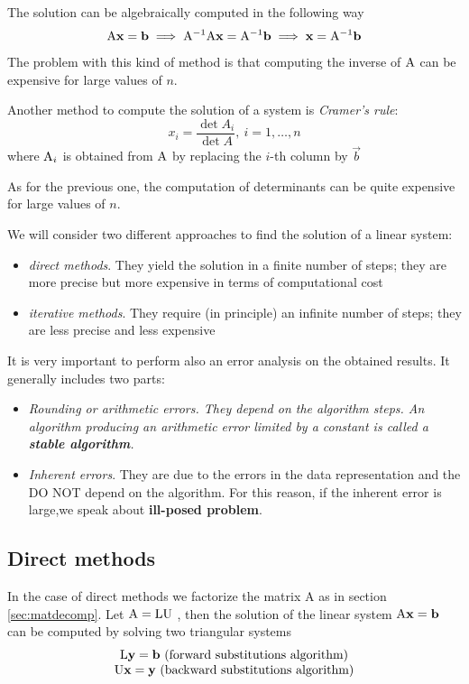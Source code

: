 The solution can be algebraically computed in the following way
$$ \mathrm{A}\mathbf{x} = \mathbf{b} \implies \mathrm{A}^{-1}\mathrm{A}\mathbf{x} = \mathrm{A}^{-1}\mathbf{b} \implies \mathbf{x} = \mathrm{A}^{-1}\mathbf{b} $$
The problem with this kind of method is that computing the inverse of $\mathrm{A}$ can be expensive for large values of $n$.

Another method to compute the solution of a system is \textit{Cramer's rule}:
$$ x_i = \frac{\det{A_i}}{\det{A}},\ i = 1, \hdots, n $$
where $\mathrm{A}_i$ is obtained from $\mathrm{A}$ by replacing the $i$-th column by $\vec{b}$

As for the previous one, the computation of determinants can be quite expensive for large values of $n$.

We will consider two different approaches to find the solution of a linear system:

\begin{itemize}
    \item \textit{direct methods}. They yield the solution in a finite number of steps; they are more precise but more expensive in terms of computational cost
    \item \textit{iterative methods}. They require (in principle) an infinite number of steps; they are less precise and less expensive
\end{itemize}

It is very important to perform also an error analysis on the  obtained results.  It generally includes two parts:
\begin{itemize}
    \item \em{Rounding} or \em{arithmetic errors}. They depend on the algorithm steps. An algorithm producing an arithmetic error limited by a constant is called a \textbf{stable algorithm}.
    \item \textit{Inherent errors}. They are due to the errors in the data representation and the DO NOT depend on the algorithm. For this reason, if the inherent error is large,we speak about  \textbf{ill-posed problem}.
\end{itemize}

\subsection{Direct methods}

In the case of direct methods we factorize the matrix A as in section \ref{sec:matdecomp}.
Let $\mathrm{A}=\mathrm{L} \mathrm{U}$  , then 
 the solution of the linear system $\mathrm{A}\mathbf{x} = \mathbf{b}$ can be computed by solving two triangular systems
$$
    \begin{matrix}
        \mathrm{L}\mathbf{y} = \mathbf{b}\ \text{(forward substitutions algorithm)}\\
        \mathrm{U}\mathbf{x} = \mathbf{y}\ \text{(backward substitutions algorithm)}
    \end{matrix}
$$

